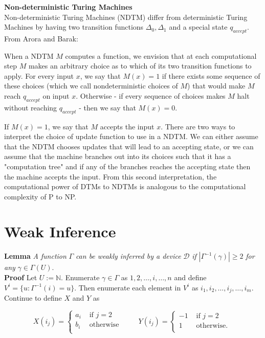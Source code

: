 \documentclass[11pt]{article}
\newcommand{\N}{\mathbb{N}}
\begin{document}
\textbf{Non-deterministic Turing Machines} \\
Non-deterministic Turing Machines (NDTM) differ from deterministic Turing Machines by having two transition functions $ \Delta_0, \Delta_1 $ and a special state $ q_{accept} $. From Arora and Barak:

\begin{displayquote}
When a NDTM $M$ computes a function, we envision that at each computational step $ M $ makes an arbitrary choice as to which of its two transition functions to apply. For every input $ x $, we say that $ M(x) = 1 $ if there exists some sequence of these choices (which we call nondeterministic choices of $ M $) that would make $ M $ reach $ q_{accept} $ on input $ x $. Otherwise - if every sequence of choices makes $ M $ halt without reaching $ q_{accept} $ - then we say that $ M(x) = 0 $. 
\end{displayquote}

If $ M(x) = 1$, we say that $ M $ accepts the input $ x $. There are two ways to interpret the choice of update function to use in a NDTM. We can either assume that the NDTM chooses updates that will lead to an accepting state, or we can assume that the machine branches out into its choices such that it has a "computation tree" and if any of the branches reaches the accepting state then the machine accepts the input. From this second interpretation, the computational power of DTMs to NDTMs is analogous to the computational complexity of P to NP. \\

\newpage
\section{Weak Inference}
\bigskip   

\textbf{Lemma} \; \textit{A function} $ \Gamma $ \textit{can be weakly inferred by a device} $ \mathcal{D} $ \textit{if} $ |\Gamma^{-1}(\gamma)| \geq 2 $ \textit{for any} $ \gamma \in \Gamma(U) $. \\
\textbf{Proof} \; Let $ U := \N $. Enumerate $ \gamma \in \Gamma $ as $ 1, 2, \dots, i, \dots, n $ and define $ V^{i} = \{u: \Gamma^{-1}(i) = u \} $. Then enumerate each element in $ V^i $ as $ i_1, i_2, \dots, i_j, \dots, i_m $. Continue to define $ X $ and $ Y $ as 

\begin{equation*}
X(i_j) = \begin{cases}
       a_i & \text{ if } j = 2 \\
       b_i & \text{ otherwise } \\
       \end{cases} \quad \quad 
Y(i_j) = \begin{cases}
       -1 & \text{ if } j = 2 \\
       1 & \text{ otherwise. } \\
       \end{cases} 
\end{equation*}
\end{document}
